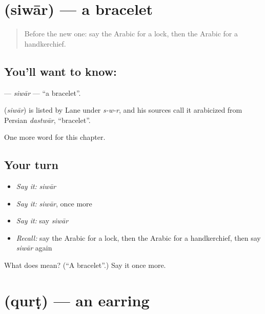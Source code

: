 \section[\texorpdfstring{\ar{سوار} (siwār)}{سوار (siwār)}]{ (siwār) — a bracelet}

\label{lesson:AR-C127-siwar}



\begin{quote}
Before the new one: say the Arabic for a lock, then the Arabic for a handkerchief.
\end{quote}

\subsection*{You'll want to know: }
\textbf{} — \emph{siwār} — \textquotedblleft{}a bracelet\textquotedblright{}.

\begin{cousinweb}
\textbf{} (\emph{siwār}) is listed by Lane under \emph{s-w-r}, and his sources call it arabicized from Persian \emph{dastwār}, \textquotedblleft{}bracelet\textquotedblright{}.
\end{cousinweb}

\begin{grammarlens}[title={What you've built}]
One more word for this chapter.
\end{grammarlens}

\subsection*{Your turn}
\begin{itemize}
\raggedright
  \item \emph{Say it:} \emph{siwār}
  \item \emph{Say it:} \emph{siwār}, once more
  \item \emph{Say it:} say \emph{siwār}
  \item \emph{Recall:} say the Arabic for a lock, then the Arabic for a handkerchief, then say \emph{siwār} again
\end{itemize}

\begin{tcolorbox}[breakable,colback=teal!4,colframe=teal!35!black,title={Before you move on}]
What does  mean? (\textquotedblleft{}A bracelet\textquotedblright{}.) Say it once more.
\end{tcolorbox}
\section[\texorpdfstring{\ar{قرط} (qurṭ)}{قرط (qurṭ)}]{ (qurṭ) — an earring}

